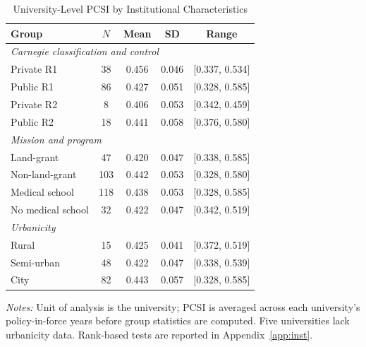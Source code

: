 \begin{table}[htbp]
\centering
\small
\caption{University-Level PCSI by Institutional Characteristics}
\label{tab:inst-means}
\begin{threeparttable}
\begin{tabular}{lcccc}
\toprule
Group & $N$ & Mean & SD & Range \\
\midrule
\multicolumn{5}{l}{\textit{Carnegie classification and control}} \\
\quad Private R1 & 38 & 0.456 & 0.046 & [0.337, 0.534] \\
\quad Public R1 & 86 & 0.427 & 0.051 & [0.328, 0.585] \\
\quad Private R2 & 8 & 0.406 & 0.053 & [0.342, 0.459] \\
\quad Public R2 & 18 & 0.441 & 0.058 & [0.376, 0.580] \\
\multicolumn{5}{l}{\textit{Mission and program}} \\
\quad Land-grant & 47 & 0.420 & 0.047 & [0.338, 0.585] \\
\quad Non-land-grant & 103 & 0.442 & 0.053 & [0.328, 0.580] \\
\quad Medical school & 118 & 0.438 & 0.053 & [0.328, 0.585] \\
\quad No medical school & 32 & 0.422 & 0.047 & [0.342, 0.519] \\
\multicolumn{5}{l}{\textit{Urbanicity}} \\
\quad Rural & 15 & 0.425 & 0.041 & [0.372, 0.519] \\
\quad Semi-urban & 48 & 0.422 & 0.047 & [0.338, 0.539] \\
\quad City & 82 & 0.443 & 0.057 & [0.328, 0.585] \\
\bottomrule
\end{tabular}
\begin{tablenotes}[flushleft]\footnotesize
\item \textit{Notes:} Unit of analysis is the university; PCSI is averaged across each university's policy-in-force years before group statistics are computed. Five universities lack urbanicity data. Rank-based tests are reported in Appendix~\ref{app:inst}.
\end{tablenotes}
\end{threeparttable}
\end{table}
